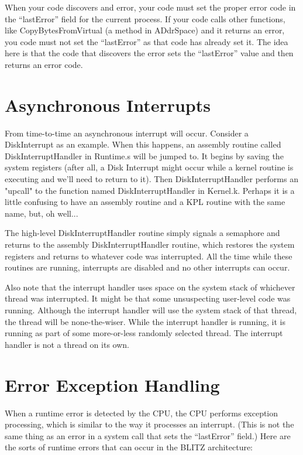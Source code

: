 \documentclass[12pt]{article}
\begin{document}
When your code discovers and error, your code must set the proper
error code in the ``lastError'' field for the current process.
If your code calls other functions, like CopyBytesFromVirtual (a
method in ADdrSpace) and it returns an error, you code must not
set the ``lastError'' as that code has already set it.   The
idea here is that the code that discovers the error sets the
``lastError'' value and then returns an error code.

\section{Asynchronous Interrupts}

From time-to-time an asynchronous interrupt will occur.  Consider a
DiskInterrupt as an example.  When this happens, an assembly routine
called DiskInterruptHandler in Runtime.s will be jumped to.  It begins
by saving the system registers (after all, a Disk Interrupt might
occur while a kernel routine is executing and we'll need to return to
it).  Then DiskInterruptHandler performs an "upcall" to the function
named DiskInterruptHandler in Kernel.k.  Perhaps it is a little
confusing to have an assembly routine and a KPL routine with the same
name, but, oh well...

The high-level DiskInterruptHandler routine simply signals a semaphore
and returns to the assembly DiskInterruptHandler routine, which
restores the system registers and returns to whatever code was
interrupted.  All the time while these routines are running,
interrupts are disabled and no other interrupts can occur.

Also note that the interrupt handler uses space on the system stack of
whichever thread was interrupted.  It might be that some unsuspecting
user-level code was running.  Although the interrupt handler will use
the system stack of that thread, the thread will be none-the-wiser.
While the interrupt handler is running, it is running as part of some
more-or-less randomly selected thread.  The interrupt handler is not a
thread on its own.

\section{Error Exception Handling}

When a runtime error is detected by the CPU, the CPU performs
exception processing, which is similar to the way it processes an
interrupt.  (This is not the same thing as an error in a system call
that sets the ``lastError'' field.)  Here are the sorts of runtime
errors that can occur in the BLITZ architecture:
\end{document}
